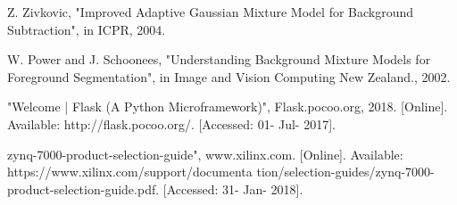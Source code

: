 \documentclass[12pt,a4paper]{report}
\begin{document}
\begin{thebibliography}{10}
Z. Zivkovic, "Improved Adaptive Gaussian Mixture Model for Background Subtraction", in ICPR, 2004.

W. Power and J. Schoonees, "Understanding Background Mixture Models for Foreground Segmentation", in Image and Vision Computing New Zealand., 2002.

"Welcome | Flask (A Python Microframework)", Flask.pocoo.org, 2018. [Online]. Available: http://flask.pocoo.org/. [Accessed: 01- Jul- 2017].

zynq-7000-product-selection-guide", www.xilinx.com. [Online]. Available: https://www.xilinx.com/support/documenta tion/selection-guides/zynq-7000-product-selection-guide.pdf. [Accessed: 31- Jan- 2018].

\end{thebibliography}
\end{document}
